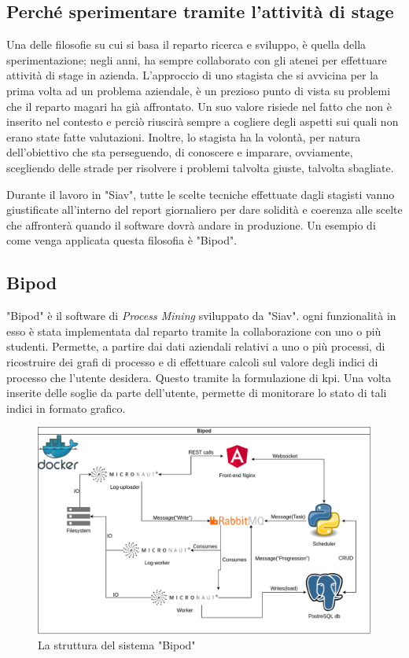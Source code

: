 \subsection{Perché sperimentare tramite l'attività di stage}
\label{ssec:sperimentareStage}
Una delle filosofie su cui si basa il reparto ricerca e sviluppo, è quella della sperimentazione; negli anni, ha sempre collaborato con gli atenei per effettuare attività di stage in azienda. L'approccio di uno stagista che si avvicina per la prima volta ad un problema aziendale, è un prezioso punto di vista su problemi che il reparto magari ha già affrontato. Un suo valore risiede nel fatto che non è inserito nel contesto e perciò riuscirà sempre a cogliere degli aspetti sui quali non erano state fatte valutazioni. Inoltre, lo stagista ha la volontà, per natura dell'obiettivo che sta perseguendo, di conoscere e imparare, ovviamente, scegliendo delle strade per risolvere i problemi talvolta giuste, talvolta sbagliate.

Durante il lavoro in "Siav", tutte le scelte tecniche effettuate dagli stagisti vanno giustificate all'interno del report giornaliero per dare solidità e coerenza alle scelte che affronterà quando il software dovrà andare in produzione. Un esempio di come venga applicata questa filosofia è "Bipod".
\subsection{Bipod}
"Bipod" è il software di \textit{Process Mining} sviluppato da "Siav". ogni funzionalità in esso è stata implementata dal reparto tramite la collaborazione con uno o più studenti. Permette, a partire dai dati aziendali relativi a uno o più processi, di ricostruire dei grafi di processo e di effettuare calcoli sul valore degli indici di processo che l'utente desidera. Questo tramite la formulazione di \acrshort{kpi}\glsfirstoccur. Una volta inserite delle soglie da parte dell'utente, permette di monitorare lo stato di tali indici in formato grafico.
\begin{figure}[H]
    \centering
    \includegraphics[width=\columnwidth]{immagini/Bipod docker scheme.png}
    \caption{La struttura del sistema "Bipod"}
    \label{fig:bipodMessages}
\end{figure}

